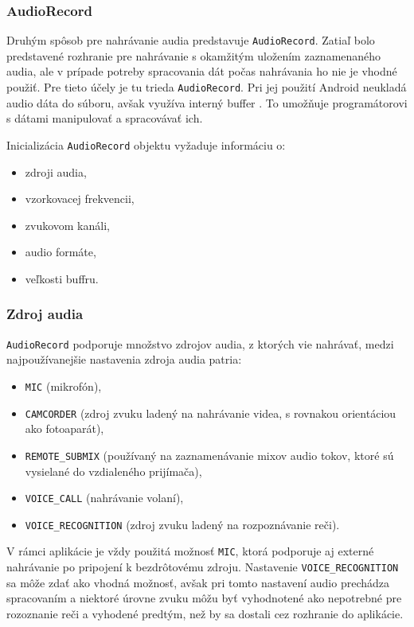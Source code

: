 \subsubsection{AudioRecord}

Druhým spôsob pre nahrávanie audia predstavuje \texttt{AudioRecord}. Zatiaľ bolo predstavené rozhranie pre nahrávanie s okamžitým uložením zaznamenaného audia, ale v prípade potreby spracovania dát počas nahrávania ho nie je vhodné použiť. Pre tieto účely je tu trieda \texttt{AudioRecord}. Pri jej použití Android neukladá audio dáta do súboru, avšak využíva interný buffer \cite{Komatineni}. To umožňuje programátorovi s dátami manipulovať a spracovávať ich. 

Inicializácia \texttt{AudioRecord} objektu vyžaduje informáciu o:
\begin{itemize}
  \item{zdroji audia,}
  \item{vzorkovacej frekvencii,}
  \item{zvukovom kanáli,}
  \item{audio formáte,}
  \item{veľkosti buffru.}
\end{itemize}

\subsubsection{Zdroj audia}


\texttt{AudioRecord} podporuje množstvo zdrojov audia, z ktorých vie nahrávať, medzi najpoužívanejšie nastavenia zdroja audia patria:

\begin{itemize}
  \item{\texttt{MIC} (mikrofón),}
  \item{\texttt{CAMCORDER} (zdroj zvuku ladený na nahrávanie videa, s rovnakou orientáciou ako fotoaparát),}
  \item{\texttt{REMOTE\_SUBMIX} (používaný na zaznamenávanie mixov audio tokov, ktoré sú vysielané do vzdialeného prijímača),}
  \item{\texttt{VOICE\_CALL} (nahrávanie volaní),}
  \item{\texttt{VOICE\_RECOGNITION} (zdroj zvuku ladený na rozpoznávanie reči).}
\end{itemize}

V rámci aplikácie je vždy použitá možnosť \texttt{MIC}, ktorá podporuje aj externé nahrávanie po pripojení k bezdrôtovému zdroju. Nastavenie \texttt{VOICE\_RECOGNITION} sa môže zdať ako vhodná možnosť, avšak pri tomto nastavení audio prechádza spracovaním a niektoré úrovne zvuku môžu byť vyhodnotené ako nepotrebné pre rozoznanie reči a vyhodené predtým, než by sa dostali cez rozhranie do aplikácie.

